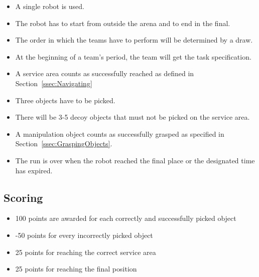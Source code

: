 \begin{itemize}
\item A single robot is used.
\item The robot has to start from outside the arena and to end in the final.
\item The order in which the teams have to perform will be determined by a draw.
\item At the beginning of a team's period, the team will get the task specification.
\item A service area counts as successfully reached as defined in Section~\ref{ssec:Navigating}
\item Three objects have to be picked.
\item There will be 3-5 decoy objects that must not be picked on the service area.
\item A manipulation object counts as successfully grasped as specified in Section~\ref{ssec:GraspingObjects}.
\item The run is over when the robot reached the final place or the designated time has expired.
\end{itemize}

\subsection{Scoring}
\begin{itemize}
\item 100 points are awarded for each correctly and successfully picked object
\item -50 points for every incorrectly picked object
\item 25 points for reaching the correct service area
\item 25 points for reaching the final position
\end{itemize}
